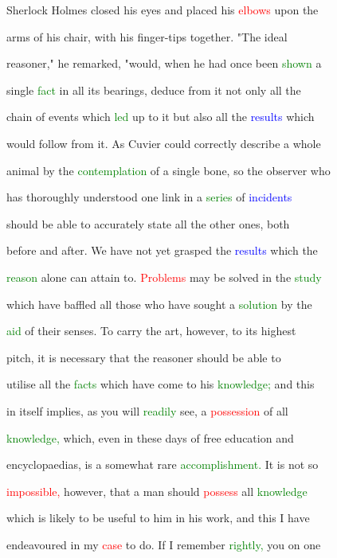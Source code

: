  Sherlock Holmes closed his eyes and placed his \textcolor{red}{elbows} upon the

 arms of his chair, with his finger-tips together. "The ideal

 reasoner," he remarked, "would, when he had once been \textcolor{green}{shown} a

 single \textcolor{green}{fact} in all its bearings, deduce from it not only all the

 chain of events which \textcolor{green}{led} up to it but also all the \textcolor{blue}{results} which

 would follow from it. As Cuvier could correctly describe a whole

 animal by the \textcolor{green}{contemplation} of a single bone, so the observer who

 has thoroughly understood one link in a \textcolor{green}{series} of \textcolor{blue}{incidents}

 should be able to accurately state all the other ones, both

 before and after. We have not yet grasped the \textcolor{blue}{results} which the

 \textcolor{green}{reason} alone can attain to. \textcolor{red}{Problems} may be solved in the \textcolor{green}{study}

 which have baffled all those who have sought a \textcolor{green}{solution} by the

 \textcolor{green}{aid} of their senses. To carry the \textcolor{BurntOrange}{art,} however, to its highest

 pitch, it is necessary that the reasoner should be able to

 utilise all the \textcolor{green}{facts} which have come to his \textcolor{green}{knowledge;} and this

 in itself implies, as you will \textcolor{green}{readily} see, a \textcolor{red}{possession} of all

 \textcolor{green}{knowledge,} which, even in these days of free education and

 encyclopaedias, is a somewhat rare \textcolor{green}{accomplishment.} It is not so

 \textcolor{red}{impossible,} however, that a man should \textcolor{red}{possess} all \textcolor{green}{knowledge}

 which is likely to be useful to him in his work, and this I have

 endeavoured in my \textcolor{red}{case} to do. If I remember \textcolor{green}{rightly,} you on one

